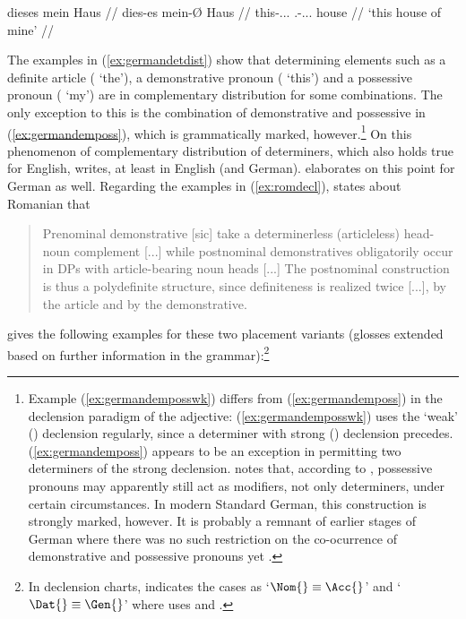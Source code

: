 	\a\ljudge\hash\label{ex:germandemposs}\begingl
		\gla dieses mein Haus //
		\glb dies-es mein-Ø Haus //
		\glc this-\Nom{}.\Sg{}.\N{}.\St{} 
			\Fsg{}.\Gen{}-\Nom{}.\Sg{}.\N{}.\St{} house //
		\glft `this house of mine' //
	\endgl
\xe

The examples in (\ref{ex:germandetdist}) show that determining elements such as
a definite article ( `the'), a demonstrative pronoun (
`this') and a possessive pronoun ( `my') are in complementary
distribution for some combinations. The only exception to this is the
combination of demonstrative and possessive in (\ref{ex:germandemposs}), which
is grammatically marked, however.\footnote{Example (\ref{ex:germandemposswk})
differs from (\ref{ex:germandemposs}) in the declension paradigm of the
adjective: (\ref{ex:germandemposswk}) uses the `weak' (\Wk) declension
regularly, since a determiner with strong (\St) declension precedes.
(\ref{ex:germandemposs}) appears to be an exception in permitting two
determiners of the strong declension. \citet[160--161, 203--205]{demske2001}
notes that, according to \citet{plank1992}, possessive pronouns may apparently
still act as modifiers, not only determiners, under certain circumstances. In
modern Standard German, this construction is strongly marked, however. It is
probably a remnant of earlier stages of German where there was no such
restriction on the co-ocurrence of demonstrative and possessive pronouns yet
\citep[173]{demske2001}.} On this phenomenon of complementary distribution of
determiners, which also holds true for English, \citet[208]{carnie2013} writes,
 at least in English
(and German). \citet[9--22]{demske2001} elaborates on this point for German as
well. Regarding the examples in (\ref{ex:romdecl}), \citet{dindelegan2013}
states about Romanian that

\blockcquote[297]{dindelegan2013}{Prenominal demonstrative [sic] take a
determinerless (articleless) head-noun complement [...] while postnominal
demonstratives obligatorily occur in DPs with article-bearing noun heads [...]
The postnominal construction is thus a polydefinite structure, since
definiteness is realized twice [...], by the article and by the demonstrative.}

\citet[297]{dindelegan2013} gives the following examples for these two
placement variants (glosses extended based on further information in the
grammar):\footnote{In declension charts, \citet{dindelegan2013} indicates the
cases as `$\Nom{}\equiv\Acc{}$' and `$\Dat{}\equiv\Gen{}$' where
\citet{lyons1999} uses \Pri{} and \Obl{}.}

